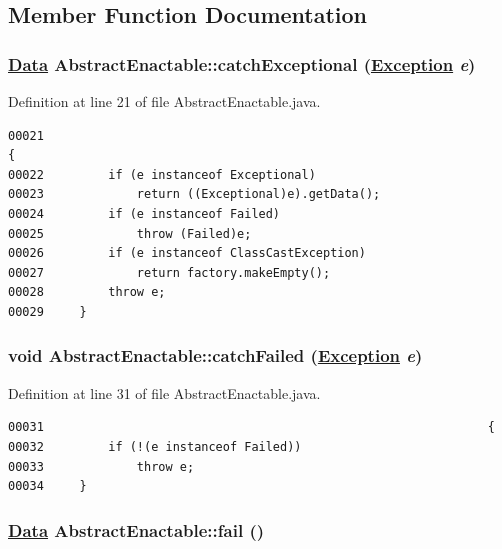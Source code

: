 \subsection{Member Function Documentation}
\hypertarget{classAbstractEnactable_b2}{
\subsubsection[catchExceptional]{\setlength{\rightskip}{0pt plus 5cm}\hyperlink{interfaceData}{Data} Abstract\-Enactable::catch\-Exceptional (\hyperlink{classException}{Exception} {\em e})}}
\label{classAbstractEnactable_b2}




Definition at line 21 of file Abstract\-Enactable.java.\footnotesize\begin{verbatim}00021                                                                   {
00022         if (e instanceof Exceptional) 
00023             return ((Exceptional)e).getData();
00024         if (e instanceof Failed)
00025             throw (Failed)e;
00026         if (e instanceof ClassCastException)
00027             return factory.makeEmpty(); 
00028         throw e;
00029     }
\end{verbatim}\normalsize 
\hypertarget{classAbstractEnactable_b3}{
\subsubsection[catchFailed]{\setlength{\rightskip}{0pt plus 5cm}void Abstract\-Enactable::catch\-Failed (\hyperlink{classException}{Exception} {\em e})}}
\label{classAbstractEnactable_b3}




Definition at line 31 of file Abstract\-Enactable.java.\footnotesize\begin{verbatim}00031                                                              {
00032         if (!(e instanceof Failed))
00033             throw e;
00034     }
\end{verbatim}\normalsize 
\hypertarget{classAbstractEnactable_b0}{
\subsubsection[fail]{\setlength{\rightskip}{0pt plus 5cm}\hyperlink{interfaceData}{Data} Abstract\-Enactable::fail ()}}
\label{classAbstractEnactable_b0}




